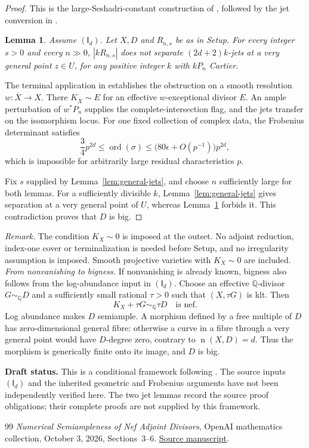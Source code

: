 \documentclass[12pt,a4paper,psamsfonts]{amsart}
\theoremstyle{definition}
\theoremstyle{plain}
\newtheorem{lemma}{Lemma}[section]
\newcommand{\Q}{\mathbb Q}
\newcommand{\nef}{\operatorname{n}}
\DeclareMathOperator{\ord}{ord}
\begin{document}
\begin{proof}
This is the large-Seshadri-constant construction of
\cite[Section~5]{NS}, followed by the jet conversion in
\cite[Section~6.7]{NS}.

\begin{lemma}\label{lem:general-nojets}
Assume $(\mathsf I_d)$. Let $X,D$ and $R_{n,s}$ be as in Setup.
For every integer $s>0$ and every $n\gg0$, $|kR_{n,s}|$ does not
separate $(2d+2)k$-jets at a very general point $z\in U$, for any
positive integer $k$ with $kP_n$ Cartier.
\end{lemma}

The terminal application in \cite[Section~6.7]{NS} establishes
the obstruction on a smooth resolution $w:\overline X\to X$.
There $K_{\overline X}\sim E$ for an effective $w$-exceptional
divisor $E$. An ample perturbation of $w^*P_n$ supplies the
complete-intersection flag, and the jets transfer on the
isomorphism locus. For one fixed collection of complex data,
the Frobenius determinant satisfies
\[
 \frac34p^{2d}\le\ord(\sigma)
 \le\bigl(80\epsilon+O(p^{-1})\bigr)p^{2d},
\]
which is impossible for arbitrarily large residual
characteristics $p$.

Fix $s$ supplied by Lemma~\ref{lem:general-jets}, and choose
$n$ sufficiently large for both lemmas. For a sufficiently
divisible $k$, Lemma~\ref{lem:general-jets} gives separation at a
very general point of $U$, whereas
Lemma~\ref{lem:general-nojets} forbids it. This contradiction
proves that $D$ is big.
\end{proof}

\medskip
\noindent\textit{Remark.}
The condition $K_X\sim0$ is imposed at the outset. No adjoint
reduction, index-one cover or terminalization is needed before
Setup, and no irregularity assumption is imposed. Smooth
projective varieties with $K_X\sim0$ are included.
\medskip
\noindent\textit{From nonvanishing to bigness.}
If nonvanishing is already known, bigness also follows from
the log-abundance input in $(\mathsf I_d)$. Choose an effective
$\Q$-divisor $G\sim_{\Q}D$ and a sufficiently small rational
$\tau>0$ such that $(X,\tau G)$ is klt. Then
\[
 K_X+\tau G\sim_{\Q}\tau D\quad\text{is nef}.
\]
Log abundance makes $D$ semiample. A morphism defined by a
free multiple of $D$ has zero-dimensional general fibre:
otherwise a curve in a fibre through a very general point
would have $D$-degree zero, contrary to $\nef(X,D)=d$.
Thus the morphism is generically finite onto its image, and
$D$ is big.

\medskip
\noindent\textbf{Draft status.}
This is a conditional framework following \cite[Sections~5--6]{NS}.
The source inputs $(\mathsf I_d)$ and the inherited geometric and
Frobenius arguments have not been independently verified here.
The two jet lemmas record the source proof obligations; their
complete proofs are not supplied by this framework.

\begin{thebibliography}{99}
\emph{Numerical Semiampleness of Nef Adjoint Divisors},
OpenAI mathematics collection, October 3, 2026,
Sections~3--6.
\href{https://github.com/openai/math/blob/main/preprints/Numerical-Semiampleness-of-Nef-Adjoint-Divisors-October-3-2026/paper.pdf}{Source manuscript}.
\end{thebibliography}
\end{document}
